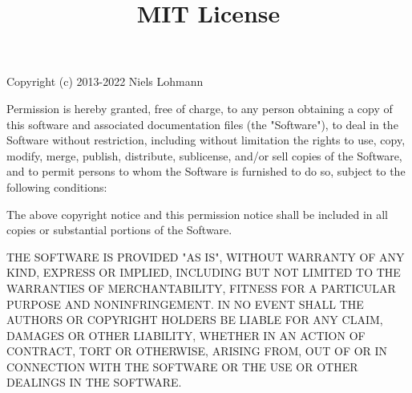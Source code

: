 \documentclass[a4paper, 12pt]{article}
\begin{document}
\title{MIT License}
\date{}

\maketitle

Copyright (c) 2013-2022 Niels Lohmann

\vspace{0.5cm}

Permission is hereby granted, free of charge, to any person obtaining a copy
of this software and associated documentation files (the "Software"), to deal
in the Software without restriction, including without limitation the rights
to use, copy, modify, merge, publish, distribute, sublicense, and/or sell
copies of the Software, and to permit persons to whom the Software is
furnished to do so, subject to the following conditions:

\vspace{0.5cm}

The above copyright notice and this permission notice shall be included in all
copies or substantial portions of the Software.

\vspace{0.5cm}

THE SOFTWARE IS PROVIDED "AS IS", WITHOUT WARRANTY OF ANY KIND, EXPRESS OR
IMPLIED, INCLUDING BUT NOT LIMITED TO THE WARRANTIES OF MERCHANTABILITY,
FITNESS FOR A PARTICULAR PURPOSE AND NONINFRINGEMENT. IN NO EVENT SHALL THE
AUTHORS OR COPYRIGHT HOLDERS BE LIABLE FOR ANY CLAIM, DAMAGES OR OTHER
LIABILITY, WHETHER IN AN ACTION OF CONTRACT, TORT OR OTHERWISE, ARISING FROM,
OUT OF OR IN CONNECTION WITH THE SOFTWARE OR THE USE OR OTHER DEALINGS IN THE
SOFTWARE.
\end{document}
